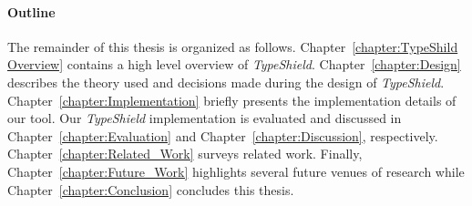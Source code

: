 \paragraph{Outline}
The remainder of this thesis is organized as follows.
Chapter~\ref{chapter:TypeShild Overview} contains a high level overview of \textit{TypeShield}.
Chapter~\ref{chapter:Design} describes the theory used and decisions made during the design of \textit{TypeShield}.
Chapter~\ref{chapter:Implementation} briefly presents the implementation details of our tool.
Our \textit{TypeShield} implementation is evaluated and discussed in
Chapter~\ref{chapter:Evaluation} and Chapter~\ref{chapter:Discussion}, respectively.
Chapter~\ref{chapter:Related_Work} surveys related work.
Finally, Chapter~\ref{chapter:Future_Work} highlights several future venues of research while
Chapter~\ref{chapter:Conclusion} concludes this thesis.


